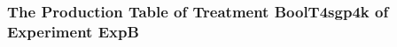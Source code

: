  \begin{frame}
 \fontsize{8pt}{9pt}\selectfont
 \frametitle{ The Production Table of Treatment BoolT4sgp4k of Experiment ExpB }

 \label{ExpBGrammarTable029.tex}  
 \end{frame}

